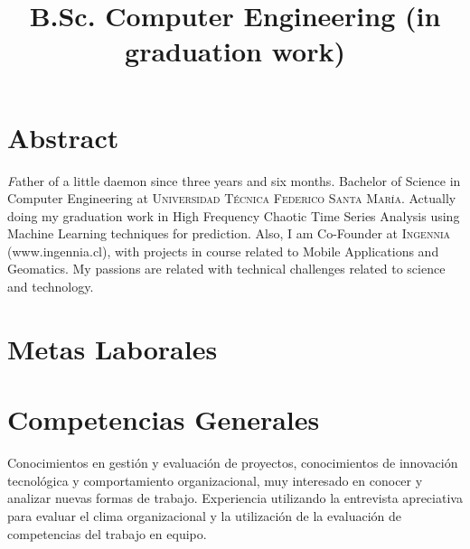 \documentclass[11pt,letterpaper,roman]{moderncv}
\title{\normalfont \small B.Sc. Computer Engineering (in graduation work) }
\begin{document}
\maketitle

\section*{\textbf{Abstract}} \textsl Father of a little daemon since three years
and six months. Bachelor of Science in Computer Engineering at
\textsc{Universidad Técnica Federico Santa María}.  Actually doing my graduation
work in High Frequency Chaotic Time Series Analysis using Machine Learning
techniques for prediction.  Also, I am Co-Founder at \textsc{Ingennia}
(www.ingennia.cl), with projects in course related to Mobile Applications and
Geomatics. My passions are related with technical challenges related to science
and technology.
    \newline \section{Metas Laborales} 

\section{Competencias Generales}
	{Conocimientos en gesti\'on y evaluaci\'on de proyectos,
	conocimientos de innovaci\'on tecnol\'ogica y comportamiento organizacional,
	muy interesado en conocer y analizar nuevas formas de trabajo. Experiencia utilizando la 
	entrevista apreciativa para evaluar el clima organizacional y la utilizaci\'on de 
	la evaluaci\'on de competencias del trabajo en equipo.}	
\end{document}
